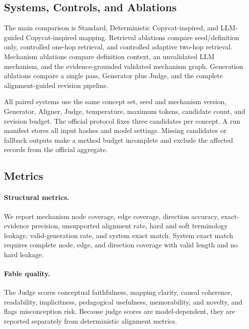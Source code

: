 \documentclass[letterpaper]{article} %
\begin{document}
\subsection{Systems, Controls, and Ablations}

The main comparison is Standard, Deterministic Copycat-inspired, and LLM-guided Copycat-inspired mapping. Retrieval ablations compare seed/definition only, controlled one-hop retrieval, and controlled adaptive two-hop retrieval. Mechanism ablations compare definition context, an unvalidated LLM mechanism, and the evidence-grounded validated mechanism graph. Generation ablations compare a single pass, Generator plus Judge, and the complete alignment-guided revision pipeline.

All paired systems use the same concept set, seed and mechanism version, Generator, Aligner, Judge, temperature, maximum tokens, candidate count, and revision budget. The official protocol fixes three candidates per concept. A run manifest stores all input hashes and model settings. Missing candidates or fallback outputs make a method budget incomplete and exclude the affected records from the official aggregate.

\subsection{Metrics}

\paragraph{Structural metrics.}
We report mechanism node coverage, edge coverage, direction accuracy, exact-evidence precision, unsupported alignment rate, hard and soft terminology leakage, valid-generation rate, and system exact match. System exact match requires complete node, edge, and direction coverage with valid length and no hard leakage.

\paragraph{Fable quality.}
The Judge scores conceptual faithfulness, mapping clarity, causal coherence, readability, implicitness, pedagogical usefulness, memorability, and novelty, and flags misconception risk. Because judge scores are model-dependent, they are reported separately from deterministic alignment metrics.
\end{document}
